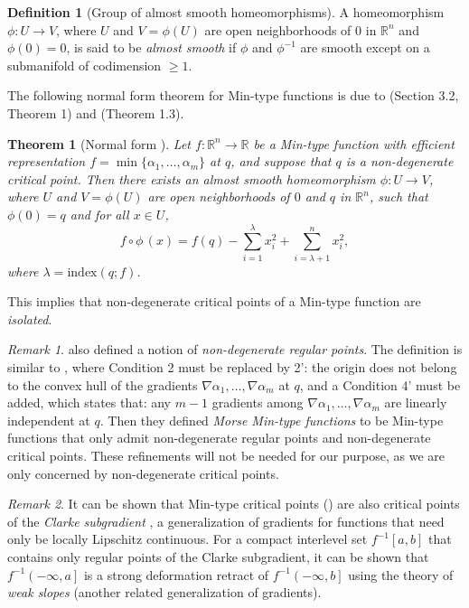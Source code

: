 \documentclass[11pt]{article}
\newcommand{\R}{\mathbb{R}}
\newcommand{\idx}{\mathrm{index}}
\newcommand{\grad}{\nabla}
\newcommand{\sublevel}[2]{{#1}^{-1}\left(-\infty, {#2}\right]}
\newcommand{\intlevel}[3]{{#1}^{-1}\left[{#2}, {#3}\right]}
\theoremstyle{plain}
\newtheorem{thm}{Theorem}
\theoremstyle{definition}
\newtheorem{defi}{Definition}
\theoremstyle{remark}
\newtheorem{rmk}{Remark}
\begin{document}
\begin{defi}[Group of almost smooth homeomorphisms]
	A homeomorphism $\phi : U \to V$, where $U$ and $V = \phi(U)$ are open neighborhoods of $0$ in $\R^n$ and $\phi(0) = 0$, is said to be \textit{almost smooth} if $\phi$ and $\phi^{-1}$ are smooth except on a submanifold of codimension $\geq 1$.
\end{defi}

The following normal form theorem for Min-type functions is due to \cite{gershkovich_morse_1997} (Section 3.2, Theorem 1) and \cite{gershkovich_singularity_1997} (Theorem 1.3). 
\begin{thm}[Normal form \citep{gershkovich_morse_1997}]
	\label{thm:normal_form}
	Let $f : \R^n \to \R$ be a Min-type function with efficient representation $f = \min \{ \alpha_1, \ldots, \alpha_m\}$ at $q$, and suppose that $q$ is a non-degenerate critical point. Then there exists an almost smooth homeomorphism $\phi : U \to V$, where $U$ and $V = \phi(U)$ are open neighborhoods of $0$ and $q$ in $\R^n$, such that $\phi(0) = q$ and for all $x \in U$, 
	\[ f \circ \phi \,(x) = f(q) - \sum_{i = 1}^{\lambda} x_i^2 + \sum_{i = \lambda + 1}^{n} x_i^2,\]
	where $\lambda = \idx(q; f)$. 
\end{thm}
This implies that non-degenerate critical points of a Min-type function are \emph{isolated}.

\begin{rmk}
	\cite{gershkovich_morse_1997} also defined a notion of \emph{non-degenerate regular points}. The definition is similar to , where Condition 2 must be replaced by 2': the origin does not belong to the convex hull of the gradients $\grad \alpha_1, \ldots, \grad \alpha_m$ at $q$, and a Condition 4' must be added, which states that: any $m-1$ gradients among $\grad \alpha_1, \ldots, \grad \alpha_m$ are linearly independent at $q$.
	Then they defined \emph{Morse Min-type functions} to be Min-type functions that only admit non-degenerate regular points and non-degenerate critical points. These refinements will not be needed for our purpose, as we are only concerned by non-degenerate critical points. 
\end{rmk}

\begin{rmk} \label{rmk:clarke1}
    It can be shown that Min-type critical points () are also critical points of the \emph{Clarke subgradient} \citep{clarke1990optimization,agrachev1997morse}, a generalization of gradients for functions that need only be locally Lipschitz continuous. For a compact interlevel set $\intlevel{f}{a}{b}$ that contains only regular points of the Clarke subgradient, it can be shown that $\sublevel{f}{a}$ is a strong deformation retract of $\sublevel{f}{b}$ using the theory of \emph{weak slopes} \citep{corvellec2001Second} (another related generalization of gradients).
\end{rmk}
\end{document}
